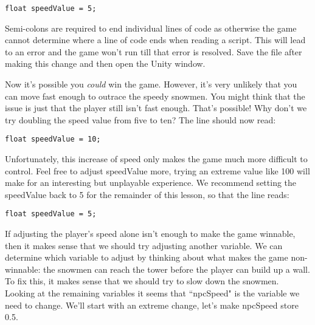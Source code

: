 \documentclass{article}
\begin{document}
\lstset{style=sharpc}
\begin{lstlisting}
float speedValue = 5;
\end{lstlisting}

Semi-colons are required to end individual lines of code as otherwise the game cannot determine where a line of code ends when reading a script. This will lead to an error and the game won't run till that error is resolved. Save the file after making this change and then open the Unity window. 

\noindent{}

Now it's possible you \textit{could} win the game. However, it's very unlikely that you can move fast enough to outrace the speedy snowmen. You might think that the issue is just that the player still isn't fast enough. That's possible! Why don't we try doubling the speed value from five to ten? The line should now read:

\lstset{style=sharpc}
\begin{lstlisting}
float speedValue = 10;
\end{lstlisting}

\noindent{}

Unfortunately, this increase of speed only makes the game much more difficult to control. Feel free to adjust speedValue more, trying an extreme value like 100 will make for an interesting but unplayable experience. We recommend setting the speedValue back to 5 for the remainder of this lesson, so that the line reads: 

\lstset{style=sharpc}
\begin{lstlisting}
float speedValue = 5;
\end{lstlisting}

If adjusting the player's speed alone isn't enough to make the game winnable, then it makes sense that we should try adjusting another variable. We can determine which variable to adjust by thinking about what makes the game non-winnable: the snowmen can reach the tower before the player can build up a wall. To fix this, it makes sense that we should try to slow down the snowmen. Looking at the remaining variables it seems that ``npcSpeed" is the variable we need to change. We'll start with an extreme change, let's make npcSpeed store 0.5. 
\end{document}
